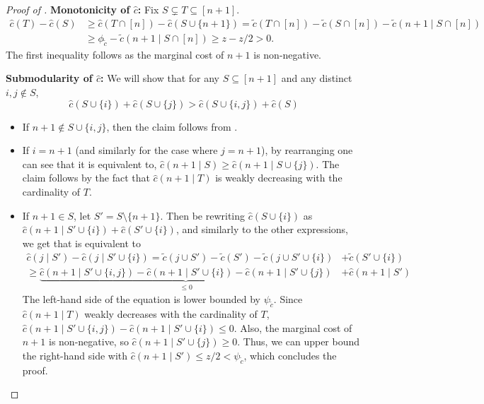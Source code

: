 \documentclass[11pt]{article}
\newcommand{\tc}{\tilde{c}}
\newcommand{\hc}{\hat{c}}
\begin{document}
\begin{proof}[Proof of ]
    \textbf{Monotonicity of $\hc$:} 
    Fix $S \subsetneq T \subseteq [n+1]$. 
    \begin{align*}
            \hc(T) - \hc(S) 
            &\ge 
            \hc(T \cap [n]) - \hc(S \cup \{n+1\}) 
            = \tc(T\cap [n]) - \tc(S\cap [n]) - \tc(n+1\mid S\cap[n]) \\
            &\ge \phi_{\tc} - \tc(n+1\mid S\cap[n]) 
            \ge z - z/2 
            > 0.
    \end{align*}
    The first inequality follows as the marginal cost of $n+1$ is non-negative.  
    
    \noindent\textbf{Submodularity of $\hc$:} 
    We will show that for any $S \subseteq [n+1]$ and any distinct $i,j \notin S$,
    \begin{equation}\label{eq:tcSubMod}
        \hc(S \cup \{i\}) + \hc(S \cup \{j\}) > \hc(S \cup \{i,j\}) + \hc(S)  
    \end{equation}

    \begin{itemize}
    \setlength\itemsep{-0.25em}
    \item If $n+1 \notin S \cup \{i,j\}$, then the claim follows from .

    \item If $i=n+1$ (and similarly for the case where $j=n+1$), by rearranging  one can see that it is equivalent to,
    $\hc(n+1 \mid S) \ge \hc(n+1 \mid S \cup \{j\})$. The claim follows by the fact that $\hc(n+1 \mid T)$ is weakly decreasing with the cardinality of $T$.

    \item If $n+1 \in S$, let $S' = S \setminus \{n+1\}$. 
    Then be rewriting $\hc(S \cup \{i\})$ as $\hc(n+1 \mid S' \cup \{i\}) + \hc(S'\cup\{i\})$, and similarly to the other expressions, we get that  is equivalent to
    \begin{align*}
    \hc(j \mid S') - \hc(j \mid S' \cup \{i\})
    = \tc(j \cup S') - \tc(S')
    - \tc(j \cup S' \cup \{i\}) &+ \tc(S' \cup \{i\}) \\
    \ge 
    \underbrace{\hc(n+1 \mid S'\cup\{i,j\}) - \hc(n+1 \mid S' \cup \{i\}) - \hc(n+1 \mid S' \cup \{j\}) }_{\le 0} &+
    \hc(n+1 \mid S')
    \end{align*}
    The left-hand side of the equation is lower bounded by $\psi_{\tc}$. 
    Since $\hc(n+1 \mid T)$ weakly decreases with the cardinality of $T$, $\hc(n+1 \mid S'\cup\{i,j\}) - \hc(n+1 \mid S' \cup \{i\}) \le 0$. Also, the marginal cost of $n+1$ is non-negative, so $\hc(n+1 \mid S' \cup \{j\}) \ge 0$. Thus, we can upper bound the right-hand side with
    $\hc(n+1 \mid S') \le z/2 < \psi_{\tc}$, which concludes the proof.
    \end{itemize}
    

\end{proof}
\end{document}
